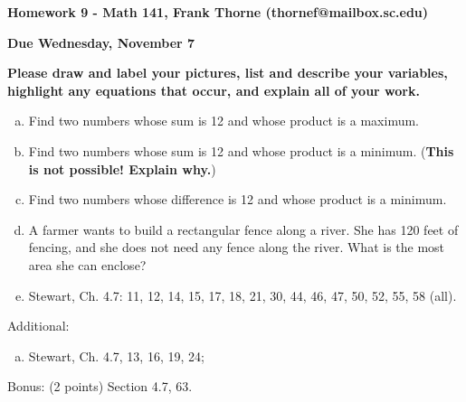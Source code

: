 \documentclass[12pt]{article}
\begin{document}
\setlength{\topmargin}{-2mm}





\begin{center}{\bf Homework 9 - Math 141, Frank Thorne (thornef@mailbox.sc.edu)}
\end{center}
\begin{center}
{\bf Due Wednesday, November 7}
\end{center}

{\bf Please draw and label your
pictures, list and describe your variables, highlight any equations that occur, and explain all of your
work.}

\begin{enumerate}[(a)]
\item
Find two numbers whose sum is 12 and whose product is a maximum.

\item
Find two numbers whose sum is 12 and whose product is a minimum.
({\bf This is not possible! Explain why.})

\item
Find two numbers whose difference is 12 and whose product is a minimum.

\item
A farmer wants to build a rectangular fence along a river. She has 120 feet of fencing,
and she does not need any fence along the river. What is the most area she can
enclose?

\item
Stewart, Ch. 4.7: 11, 12, 14, 15, 17, 18, 21, 30, 44, 46, 47, 50, 52, 
55, 58 (all).

\end{enumerate}
Additional:
\begin{enumerate}[(a)]
\item
Stewart, Ch. 4.7, 13, 16, 19, 24; 
\end{enumerate}
Bonus: (2 points) Section 4.7, 63. 
\end{document}

